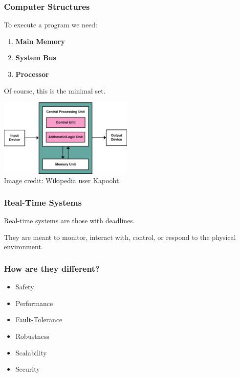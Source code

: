 \begin{frame}
\frametitle{Computer Structures}

To execute a program we need:

	\begin{enumerate}
		\item \textbf{Main Memory}
		\item \textbf{System Bus}
		\item \textbf{Processor}
	\end{enumerate}

	Of course, this is the minimal set.

	\begin{center}
		\includegraphics[width=0.5\textwidth]{images/von-neumann}\\
		Image credit: Wikipedia user Kapooht
	\end{center}



\end{frame}

\begin{frame}
\frametitle{Real-Time Systems}

Real-time systems are those with deadlines. 

They are meant to monitor, interact with, control, or respond to the physical environment.

\end{frame}

\begin{frame}
\frametitle{How are they different?}

\begin{itemize}
	\item Safety
	\item Performance
	\item Fault-Tolerance
	\item Robustness
	\item Scalability
	\item Security
\end{itemize}

\end{frame}

